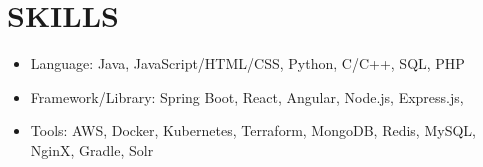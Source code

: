 \section{SKILLS}
\begin{itemize}
    \item Language: Java, JavaScript/HTML/CSS, Python, C/C++, SQL, PHP
    \item Framework/Library: Spring Boot, React, Angular, Node.js, Express.js, 
    \item Tools: AWS, Docker, Kubernetes, Terraform, MongoDB, Redis, MySQL, NginX, Gradle, Solr
\end{itemize}